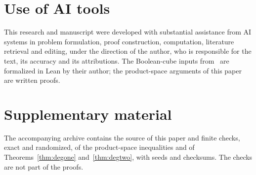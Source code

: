 \documentclass[11pt]{article}
\numberwithin{equation}{section}
\theoremstyle{plain}
\theoremstyle{remark}
\begin{document}
\section*{Use of AI tools}
This research and manuscript were developed with substantial assistance from AI systems in problem formulation, proof construction, computation, literature retrieval and editing, under the direction of the author, who is responsible for the text, its accuracy and its attributions. The Boolean-cube inputs from~\cite{Tur26} are formalized in Lean by their author; the product-space arguments of this paper are written proofs.

\section*{Supplementary material}
The accompanying archive contains the source of this paper and finite checks, exact and randomized, of the product-space inequalities and of Theorems~\ref{thm:degone} and~\ref{thm:degtwo}, with seeds and checksums. The checks are not part of the proofs.
\end{document}
